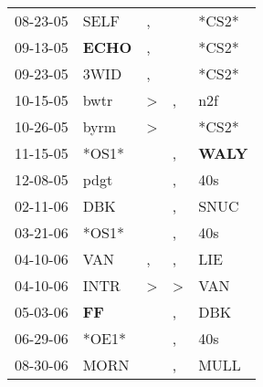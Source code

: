 \begin{supertabular}{p{0.07\textwidth}p{0.06\textwidth}p{0.02\textwidth}p{0.02\textwidth}p{0.06\textwidth}}
          08-23-05\textsuperscript{} &           SELF\textsuperscript{} &                , &                  &                            *CS2* \\
          09-13-05\textsuperscript{} &  \textbf{ECHO\textsuperscript{}} &                , &                  &                            *CS2* \\
          09-23-05\textsuperscript{} &           3WID\textsuperscript{} &                , &                  &                            *CS2* \\
          10-15-05\textsuperscript{} &           bwtr\textsuperscript{} &     \textgreater &                , &            n2f\textsuperscript{} \\
          10-26-05\textsuperscript{} &           byrm\textsuperscript{} &     \textgreater &                  &                            *CS2* \\
          11-15-05\textsuperscript{} &                            *OS1* &                  &                , &  \textbf{WALY\textsuperscript{}} \\
          12-08-05\textsuperscript{} &           pdgt\textsuperscript{} &                  &                , &            40s\textsuperscript{} \\
          02-11-06\textsuperscript{} &            DBK\textsuperscript{} &                  &                , &           SNUC\textsuperscript{} \\
          03-21-06\textsuperscript{} &                            *OS1* &                  &                , &            40s\textsuperscript{} \\
          04-10-06\textsuperscript{} &            VAN\textsuperscript{} &                , &                , &            LIE\textsuperscript{} \\
          04-10-06\textsuperscript{} &           INTR\textsuperscript{} &     \textgreater &     \textgreater &            VAN\textsuperscript{} \\
          05-03-06\textsuperscript{} &    \textbf{FF\textsuperscript{}} &                  &                , &            DBK\textsuperscript{} \\
          06-29-06\textsuperscript{} &                            *OE1* &                  &                , &            40s\textsuperscript{} \\
          08-30-06\textsuperscript{} &           MORN\textsuperscript{} &                  &                , &           MULL\textsuperscript{} \\

\end{supertabular}
